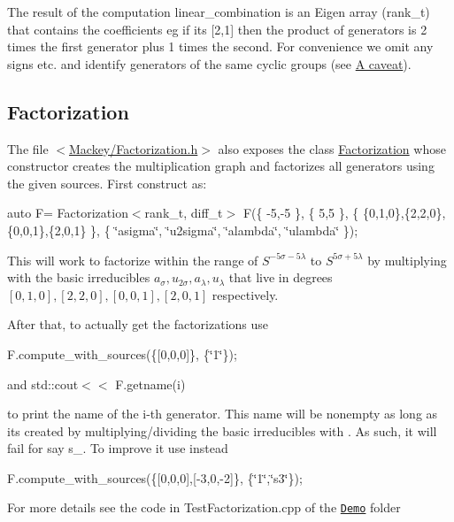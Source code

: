 The result of the computation {\ttfamily linear\+\_\+combination} is an Eigen array ({\ttfamily rank\+\_\+t}) that contains the coefficients eg if it\textquotesingle{}s {\ttfamily \mbox{[}2,1\mbox{]}} then the product of generators is 2 times the first generator plus 1 times the second. For convenience we omit any signs etc. and identify generators of the same cyclic groups (see \hyperlink{math_caveat}{A caveat}).\hypertarget{use_step1fact}{}\subsection{Factorization}\label{use_step1fact}
The file {\ttfamily $<$\hyperlink{Factorization_8h}{Mackey/\+Factorization.\+h}$>$} also exposes the class \hyperlink{classMackey_1_1Factorization}{Factorization} whose constructor creates the multiplication graph and factorizes all generators using the given sources. First construct as\+:

{\ttfamily auto F= Factorization$<$rank\+\_\+t, diff\+\_\+t$>$ F(\{ -\/5,-\/5 \}, \{ 5,5 \}, \{ \{0,1,0\},\{2,2,0\},\{0,0,1\},\{2,0,1\} \}, \{ \char`\"{}asigma\char`\"{}, \char`\"{}u2sigma\char`\"{}, \char`\"{}alambda\char`\"{}, \char`\"{}ulambda\char`\"{} \});}

This will work to factorize within the range of $S^{-5\sigma-5\lambda}$ to $S^{5\sigma+5\lambda}$ by multiplying with the basic irreducibles $ a_{\sigma}, u_{2\sigma}, a_{\lambda}, u_{\lambda}$ that live in degrees $[0,1,0],[2,2,0],[0,0,1],[2,0,1]$ respectively.

After that, to actually get the factorizations use

{\ttfamily F.\+compute\+\_\+with\+\_\+sources(\{\mbox{[}0,0,0\mbox{]}\}, \{\char`\"{}1\char`\"{}\});}

and {\ttfamily std\+::cout$<$$<$ F.\+getname(i) }

to print the name of the {\ttfamily i}-\/th generator. This name will be nonempty as long as it\textquotesingle{}s created by multiplying/dividing the basic irreducibles with {}. As such, it will fail for say {\ttfamily s\+\_}. To improve it use instead

{\ttfamily F.\+compute\+\_\+with\+\_\+sources(\{\mbox{[}0,0,0\mbox{]},\mbox{[}-\/3,0,-\/2\mbox{]}\}, \{\char`\"{}1\char`\"{},\char`\"{}s3\char`\"{}\});}

For more details see the code in Test\+Factorization.\+cpp of the \href{https://github.com/NickG-Math/Mackey/Demo}{\tt Demo} folder 